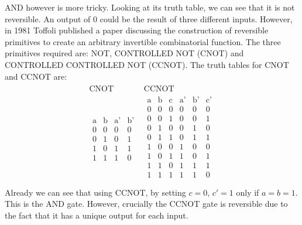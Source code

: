 \documentclass[reqno]{amsart}
\numberwithin{equation}{section}
\numberwithin{figure}{section}
\begin{document}
\begin{justify}
AND however is more tricky. Looking at its truth table, we can see that it is not reversible. An output of $0$ could be the result of three different inputs. However, in 1981 Toffoli published a paper discussing the construction of reversible primitives to create an arbitrary invertible combinatorial function. \cite{Toffoli1981} The three primitives required are: NOT, CONTROLLED NOT (CNOT) and CONTROLLED CONTROLLED NOT (CCNOT). The truth tables for CNOT and CCNOT are:
    \begin{eqnarray}
        \begin{array}{c|c}
            \text{CNOT} & \text{CCNOT} \\
            \hline
            \begin{array}{cc|cc}
                \text{a} & \text{b} & \text{a'} & \text{b'} \\
                \hline
                0 & 0 & 0 & 0 \\
                0 & 1 & 0 & 1 \\
                1 & 0 & 1 & 1 \\
                1 & 1 & 1 & 0
            \end{array} &
            \begin{array}{ccc|ccc}
                \text{a} & \text{b} & \text{c} & \text{a'} & \text{b'} & \text{c'} \\
                \hline
                0 & 0 & 0 & 0 & 0 & 0 \\
                0 & 0 & 1 & 0 & 0 & 1 \\
                0 & 1 & 0 & 0 & 1 & 0 \\
                0 & 1 & 1 & 0 & 1 & 1 \\
                1 & 0 & 0 & 1 & 0 & 0 \\
                1 & 0 & 1 & 1 & 0 & 1 \\
                1 & 1 & 0 & 1 & 1 & 1 \\
                1 & 1 & 1 & 1 & 1 & 0 \\
            \end{array}
        \end{array}
    \end{eqnarray}
Already we can see that using CCNOT, by setting $c = 0$, $c' = 1$ only if $a = b = 1$. This is the AND gate. However, crucially the CCNOT gate is reversible due to the fact that it has a unique output for each input. \\


\end{justify}
\end{document}

